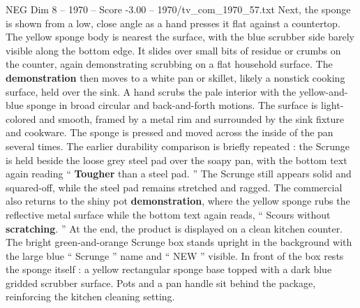 \begin{textsample}{NEG Dim 8 – 1970 – Score -3.00 – 1970/tv\_com\_1970\_57.txt}
Next, the sponge is shown from a low, close angle as a hand presses it flat against a countertop.
The yellow sponge body is nearest the surface, with the blue scrubber side barely visible along the bottom edge.
It slides over small bits of residue or crumbs on the counter, again demonstrating scrubbing on a flat household surface.
The \textbf{demonstration} then moves to a white pan or skillet, likely a nonstick cooking surface, held over the sink.
A hand scrubs the pale interior with the yellow-and-blue sponge in broad circular and back-and-forth motions.
The surface is light-colored and smooth, framed by a metal rim and surrounded by the sink fixture and cookware.
The sponge is pressed and moved across the inside of the pan several times.
The earlier durability comparison is briefly repeated : the Scrunge is held beside the loose grey steel pad over the soapy pan, with the bottom text again reading “ \textbf{Tougher} than a steel pad. ” The Scrunge still appears solid and squared-off, while the steel pad remains stretched and ragged.
The commercial also returns to the shiny pot \textbf{demonstration}, where the yellow sponge rubs the reflective metal surface while the bottom text again reads, “ Scours without \textbf{scratching}. ” At the end, the product is displayed on a clean kitchen counter.
The bright green-and-orange Scrunge box stands upright in the background with the large blue “ Scrunge ” name and “ NEW ” visible.
In front of the box rests the sponge itself : a yellow rectangular sponge base topped with a dark blue gridded scrubber surface.
Pots and a pan handle sit behind the package, reinforcing the kitchen cleaning setting.

\end{textsample}
